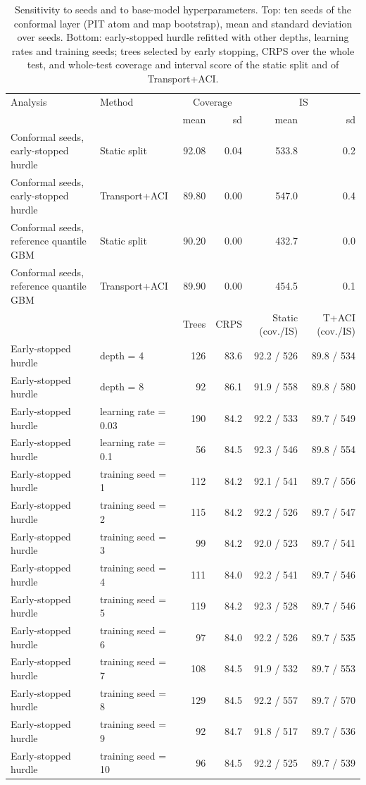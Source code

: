 \begin{table}[tp]
\centering
\footnotesize
\caption{Sensitivity to seeds and to base-model hyperparameters. Top: ten seeds of the conformal layer (PIT atom and map bootstrap), mean and standard deviation over seeds. Bottom: early-stopped hurdle refitted with other depths, learning rates and training seeds; trees selected by early stopping, CRPS over the whole test, and whole-test coverage and interval score of the static split and of Transport+ACI.}
\label{tab:sens_base}
\begin{tabular}{l l rrrr}
\toprule
Analysis & Method & \multicolumn{2}{c}{Coverage} & \multicolumn{2}{c}{IS} \\
 & & mean & sd & mean & sd \\
\midrule
Conformal seeds, early-stopped hurdle & Static split & 92.08 & 0.04 & 533.8 & 0.2 \\
Conformal seeds, early-stopped hurdle & Transport+ACI & 89.80 & 0.00 & 547.0 & 0.4 \\
Conformal seeds, reference quantile GBM & Static split & 90.20 & 0.00 & 432.7 & 0.0 \\
Conformal seeds, reference quantile GBM & Transport+ACI & 89.90 & 0.00 & 454.5 & 0.1 \\
\midrule
 & & Trees & CRPS & Static (cov./IS) & T+ACI (cov./IS) \\
\midrule
Early-stopped hurdle & depth = 4 & 126 & 83.6 & 92.2 / 526 & 89.8 / 534 \\
Early-stopped hurdle & depth = 8 & 92 & 86.1 & 91.9 / 558 & 89.8 / 580 \\
Early-stopped hurdle & learning rate = 0.03 & 190 & 84.2 & 92.2 / 533 & 89.7 / 549 \\
Early-stopped hurdle & learning rate = 0.1 & 56 & 84.5 & 92.3 / 546 & 89.8 / 554 \\
Early-stopped hurdle & training seed = 1 & 112 & 84.2 & 92.1 / 541 & 89.7 / 556 \\
Early-stopped hurdle & training seed = 2 & 115 & 84.2 & 92.2 / 526 & 89.7 / 547 \\
Early-stopped hurdle & training seed = 3 & 99 & 84.2 & 92.0 / 523 & 89.7 / 541 \\
Early-stopped hurdle & training seed = 4 & 111 & 84.0 & 92.2 / 541 & 89.7 / 546 \\
Early-stopped hurdle & training seed = 5 & 119 & 84.2 & 92.3 / 528 & 89.7 / 546 \\
Early-stopped hurdle & training seed = 6 & 97 & 84.0 & 92.2 / 526 & 89.7 / 535 \\
Early-stopped hurdle & training seed = 7 & 108 & 84.5 & 91.9 / 532 & 89.7 / 553 \\
Early-stopped hurdle & training seed = 8 & 129 & 84.5 & 92.2 / 557 & 89.7 / 570 \\
Early-stopped hurdle & training seed = 9 & 92 & 84.7 & 91.8 / 517 & 89.7 / 536 \\
Early-stopped hurdle & training seed = 10 & 96 & 84.5 & 92.2 / 525 & 89.7 / 539 \\
\bottomrule
\end{tabular}
\end{table}

